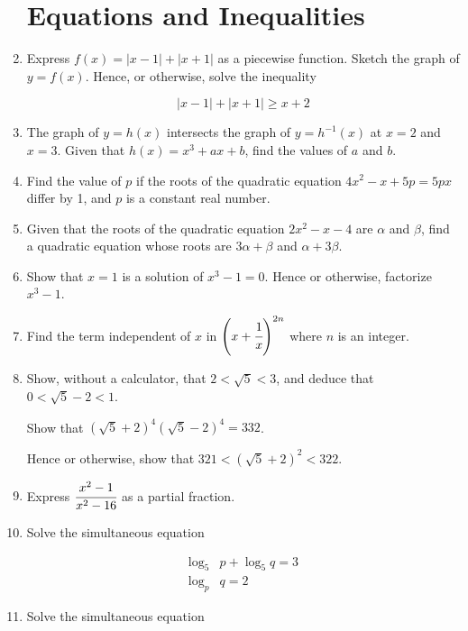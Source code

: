 \documentclass[letterpaper]{article}
\begin{document}
\begin{enumerate}

\section*{Equations and Inequalities}

\item Express $f(x) = |x-1| + |x+1|$ as a piecewise function. Sketch the graph of $y=f(x)$. Hence, or otherwise, solve the inequality

$$
|x-1| + |x+1| \ge x+2
$$

\item The graph of $y=h(x)$ intersects the graph of $y=h^{-1}(x)$ at $x=2$ and $x=3$. Given that $h(x) = x^3 + ax + b$, find the values of $a$ and $b$.

\item Find the value of $p$ if the roots of the quadratic equation $4x^2 - x + 5p = 5px$ differ by 1, and $p$ is a constant real number.

\item Given that the roots of the quadratic equation $2x^2 - x - 4$ are $\alpha$ and $\beta$, find a quadratic equation whose roots are $3\alpha + \beta$ and $\alpha + 3\beta$.

\item Show that $x=1$ is a solution of $x^3 - 1 = 0$. Hence or otherwise, factorize $x^3 - 1$.

\item Find the term independent of $x$ in $\left(x + \cfrac{1}{x}\right)^{2n}$ where $n$ is an integer.

\item Show, without a calculator, that $2 < \sqrt{5} < 3$, and deduce that $0 < \sqrt{5} - 2 < 1$.

Show that $(\sqrt 5 + 2)^4 (\sqrt 5 - 2)^4 = 332$. 

Hence or otherwise, show that $321 < (\sqrt 5  +2)^2 < 322$.

\item Express $\cfrac{x^2 - 1}{x^2 - 16}$ as a partial fraction.

\item Solve the simultaneous equation

\begin{align*}
\log_5 &p + \log_5 q = 3 \\
\log_p &q = 2
\end{align*}

\item Solve the simultaneous equation


\end{enumerate}
\end{document}
